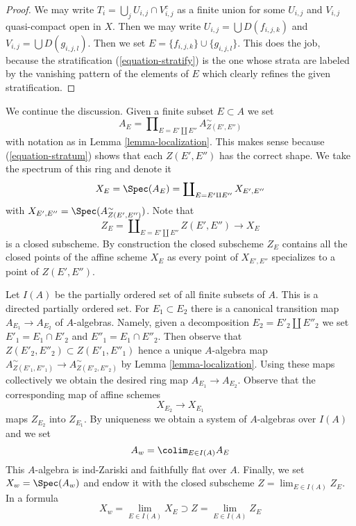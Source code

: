 \begin{proof}
We may write $T_i = \bigcup_j U_{i, j} \cap V_{i, j}^c$ as a finite union
for some $U_{i, j}$ and $V_{i, j}$ quasi-compact open in $X$.
Then we may write $U_{i, j} = \bigcup D(f_{i, j, k})$ and
$V_{i, j} = \bigcup D(g_{i, j, l})$. Then we set
$E = \{f_{i, j, k}\} \cup \{g_{i, j, l}\}$. This does the job, because
the stratification (\ref{equation-stratify}) is the one whose strata are
labeled by the vanishing pattern of the elements of $E$ which
clearly refines the given stratification.
\end{proof}

\noindent
We continue the discussion.
Given a finite subset $E \subset A$ we set
\begin{equation}
\label{equation-ring}
A_E = \prod\nolimits_{E = E' \amalg E''} A_{Z(E', E'')}^\sim
\end{equation}
with notation as in Lemma \ref{lemma-localization}. This makes sense because
(\ref{equation-stratum}) shows that each $Z(E', E'')$ has the correct shape.
We take the spectrum of this ring and denote it
\begin{equation}
\label{equation-spectrum}
X_E = \Spec(A_E) = \coprod\nolimits_{E = E' \amalg E''} X_{E', E''}
\end{equation}
with $X_{E', E''} = \Spec(A_{Z(E', E'')}^\sim)$. Note that
\begin{equation}
\label{equation-closed}
Z_E = \coprod\nolimits_{E = E' \amalg E''} Z(E', E'')
\longrightarrow
X_E
\end{equation}
is a closed subscheme. By construction the closed subscheme $Z_E$
contains all the closed points of the affine scheme $X_E$ as every point
of $X_{E', E''}$ specializes to a point of $Z(E', E'')$.

\medskip\noindent
Let $I(A)$ be the partially ordered set of all finite subsets of $A$.
This is a directed partially ordered set. For $E_1 \subset E_2$ there
is a canonical transition map $A_{E_1} \to A_{E_2}$ of $A$-algebras.
Namely, given a decomposition $E_2 = E'_2 \amalg E''_2$ we set
$E'_1 = E_1 \cap E'_2$ and $E''_1 = E_1 \cap E''_2$. Then observe that
$Z(E'_2, E''_2) \subset Z(E'_1, E''_1)$ hence a unique $A$-algebra map
$A_{Z(E'_1, E''_1)}^\sim \to A_{Z(E'_2, E''_2)}^\sim$ by
Lemma \ref{lemma-localization}. Using these maps collectively we obtain
the desired ring map $A_{E_1} \to A_{E_2}$. Observe that the corresponding
map of affine schemes
\begin{equation}
\label{equation-transition}
X_{E_2} \longrightarrow X_{E_1}
\end{equation}
maps $Z_{E_2}$ into $Z_{E_1}$. By uniqueness we obtain a system of
$A$-algebras over $I(A)$ and we set
\begin{equation}
\label{equation-colimit-ring}
A_w = \colim_{E \in I(A)} A_E
\end{equation}
This $A$-algebra is ind-Zariski and faithfully flat over $A$.
Finally, we set $X_w = \Spec(A_w)$ and endow it with the closed subscheme
$Z = \lim_{E \in I(A)} Z_E$. In a formula
\begin{equation}
\label{equation-final}
X_w = \lim_{E \in I(A)} X_E \supset Z = \lim_{E \in I(A)} Z_E
\end{equation}

